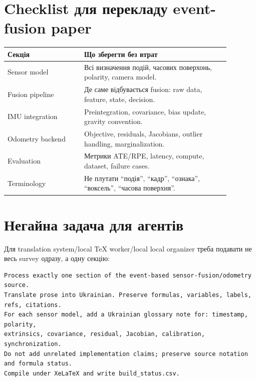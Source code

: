 \section*{Checklist для перекладу event-fusion paper}

\begin{longtable}{L{0.30\linewidth}L{0.58\linewidth}}
\toprule
Секція & Що зберегти без втрат \\
\midrule
Sensor model & Всі визначення подій, часових поверхонь, polarity, camera model. \\
Fusion pipeline & Де саме відбувається fusion: raw data, feature, state, decision. \\
IMU integration & Preintegration, covariance, bias update, gravity convention. \\
Odometry backend & Objective, residuals, Jacobians, outlier handling, marginalization. \\
Evaluation & Метрики ATE/RPE, latency, compute, dataset, failure cases. \\
Terminology & Не плутати ``подія'', ``кадр'', ``ознака'', ``воксель'', ``часова поверхня''. \\
\bottomrule
\end{longtable}

\section*{Негайна задача для агентів}

Для translation system/local TeX worker/local local organizer треба подавати не весь survey одразу, а одну секцію:
\begin{lstlisting}
Process exactly one section of the event-based sensor-fusion/odometry source.
Translate prose into Ukrainian. Preserve formulas, variables, labels, refs, citations.
For each sensor model, add a Ukrainian glossary note for: timestamp, polarity,
extrinsics, covariance, residual, Jacobian, calibration, synchronization.
Do not add unrelated implementation claims; preserve source notation and formula status.
Compile under XeLaTeX and write build_status.csv.
\end{lstlisting}
